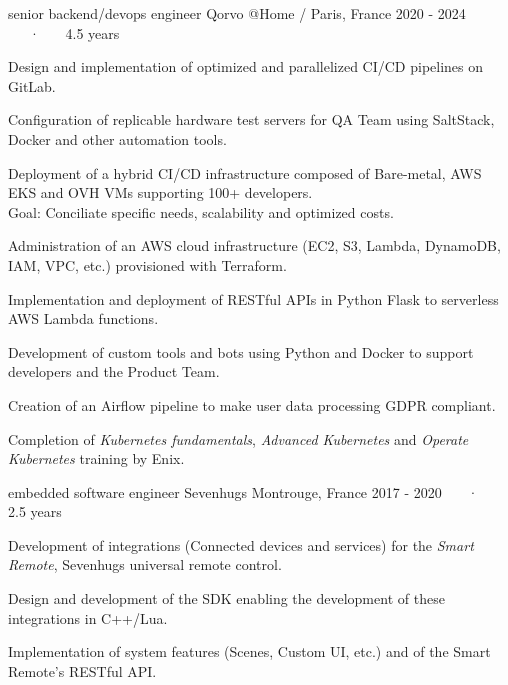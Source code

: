 \begin{cventries}
  \cventry
    {senior backend/devops engineer} %
    {Qorvo} %
    {@Home / Paris, France} %
    {2020 - 2024 ~~~·~~~ 4.5 years} %
    {
      \begin{cvitems} %
        \item{Design and implementation of optimized and parallelized CI/CD pipelines on GitLab.}
        \item{Configuration of replicable hardware test servers for QA Team using SaltStack, Docker and other automation tools.}
        \item{Deployment of a hybrid CI/CD infrastructure composed of Bare-metal, AWS EKS and OVH VMs supporting 100+ developers.\\
        Goal: Conciliate specific needs, scalability and optimized costs.}
        \item{Administration of an AWS cloud infrastructure (EC2, S3, Lambda, DynamoDB, IAM, VPC, etc.) provisioned with Terraform.}
        \item{Implementation and deployment of RESTful APIs in Python Flask to serverless AWS Lambda functions.}
        \item{Development of custom tools and bots using Python and Docker to support developers and the Product Team.}
        \item{Creation of an Airflow pipeline to make user data processing GDPR compliant.}
        \item{Completion of \textit{Kubernetes fundamentals}, \textit{Advanced Kubernetes} and \textit{Operate Kubernetes} training by Enix.}
      \end{cvitems}
    }

  \cventry
    {embedded software engineer} %
    {Sevenhugs} %
    {Montrouge, France} %
    {2017 -  2020 ~~~·~~~ 2.5 years} %
    {
      \begin{cvitems} %
        \item {Development of integrations (Connected devices and services) for the \textit{Smart Remote}, Sevenhugs universal remote control.}
        \item {Design and development of the SDK enabling the development of these integrations in C++/Lua.}
        \item {Implementation of system features (Scenes, Custom UI, etc.) and of the Smart Remote's RESTful API.}
      \end{cvitems}
    }


\end{cventries}
